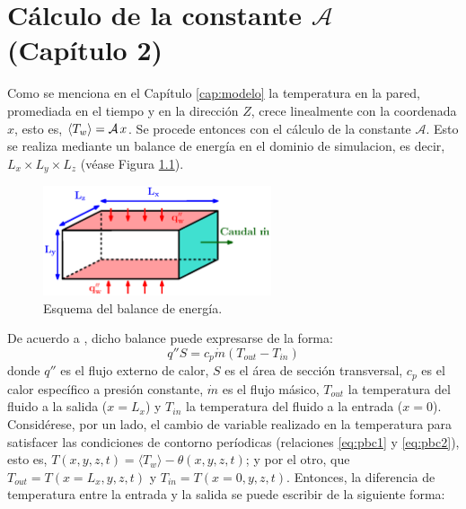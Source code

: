 \chapter{Cálculo de la constante $\mathcal{A}$ (Capítulo 2)} \label{apen:constante-A}

Como se menciona en el Capítulo \ref{cap:modelo} la temperatura en la pared, promediada en el tiempo y en la dirección $Z$, crece linealmente con la coordenada $x$, esto es, $\langle T_w \rangle = \mathcal{A} \hspace{0.5mm} x $. Se procede entonces con el cálculo de la constante $\mathcal{A}$. Esto se realiza mediante un balance de energía en el dominio de simulacion, es decir, $L_x \times L_y \times L_z$ (véase Figura \ref{fig:apendice-b}). 

\begin{figure}[H]
  \centering  
    \includegraphics[width=0.6\textwidth]{figures/apendices/apendice_b.eps}
  \caption{Esquema del balance de energía.}
  \label{fig:apendice-b}
\end{figure}
De acuerdo a \cite{cengelheat}, dicho balance puede expresarse de la forma:
$$ q'' S = c_p \dot{m} \left( T_{out} - T_{in} \right)$$
donde $q''$ es el flujo externo de calor, $S$ es el área de sección transversal, $c_p$ es el calor específico a presión constante, $\dot{m}$ es el flujo másico, $T_{out}$ la temperatura del fluido a la salida ($x=L_x$) y $T_{in}$ la temperatura del fluido a la entrada ($x=0$). Considérese, por un lado, el cambio de variable realizado en la temperatura para satisfacer las condiciones de contorno períodicas (relaciones \ref{eq:pbc1} y \ref{eq:pbc2}), esto es, $T(x,y,z,t)= \langle T_w \rangle - \theta(x,y,z,t)$; y por el otro, que $T_{out}=T(x=L_x,y,z,t)$ y $T_{in}=T(x=0,y,z,t)$. Entonces, la diferencia de temperatura entre la entrada y la salida se puede escribir de la siguiente forma:

